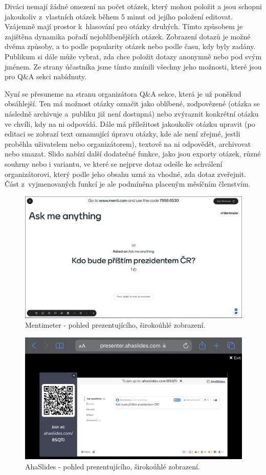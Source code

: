 Diváci nemají žádné omezení na počet otázek, který mohou položit a jsou schopni jakoukoliv z~vlastních otázek během 5 minut od jejího položení editovat. Vzájemně mají prostor k~hlasování pro otázky druhých. Tímto způsobem je zajištěna dynamika pořadí nejoblíbenějších otázek. Zobrazení dotazů je možné dvěma způsoby, a to podle popularity otázek nebo podle času, kdy byly zadány. Publikum si dále může vybrat, zda chce položit dotazy anonymně nebo pod svým jménem. Ze strany účastníka jsme tímto zmínili všechny jeho možnosti, které jsou pro Q\&A sekci nabídnuty.  

Nyní se přesuneme na stranu organizátora Q\&A sekce, která je už poněkud obsáhlejší. Ten má možnost otázky označit jako oblíbené, zodpovězené (otázka se následně archivuje a~publiku již není dostupná) nebo zvýraznit konkrétní otázku ve chvíli, kdy na ni odpovídá. Dále má příležitost jakoukoliv otázku upravit (po editaci se zobrazí text oznamující úpravu otázky, kde ale není zřejmé, jestli proběhla uživatelem nebo organizátorem), textově na ni odpovědět, archivovat nebo smazat. Slido nabízí další dodatečné funkce, jako jsou exporty otázek, různé souhrny nebo i variantu, ve které se nejprve dotaz odešle ke schválení organizátorovi, který podle jeho obsahu uzná za vhodné, zda dotaz zveřejnit. Část z~vyjmenovaných funkcí je ale podmíněna placeným měsíčním členstvím.

\begin{figure}
\centering
\includegraphics[width=.9\linewidth]{obrazky/mentimeter_admin.png}
\caption{Mentimeter - pohled prezentujícího, širokoúhlé zobrazení.}
\label{fig:sub3}
\end{figure}

\begin{figure}
\centering
\includegraphics[width=.9\linewidth]{obrazky/aha_admin.png}
\caption{AhaSlides - pohled prezentujícího, širokoúhlé zobrazení.}
\label{fig:sub4}
\end{figure}


